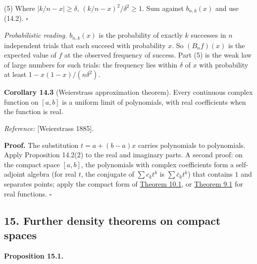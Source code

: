 \documentclass[
  english,
  11pt,
  a4paper,
]{article}
\begin{document}
(5) Where \(|k/n-x|\geq\delta\), \((k/n-x)^2/\delta^2\geq1\). Sum
against \(b_{n,k}(x)\) and use (14.2). \(\square\)

\emph{Probabilistic reading.} \(b_{n,k}(x)\) is the probability of
exactly \(k\) successes in \(n\) independent trials that each succeed
with probability \(x\). So \((B_nf)(x)\) is the expected value of \(f\)
at the observed frequency of success. Part (5) is the weak law of large
numbers for such trials: the frequency lies within \(\delta\) of \(x\)
with probability at least \(1-x(1-x)/(n\delta^2)\).

\textbf{Corollary 14.3} (Weierstrass approximation theorem). Every
continuous complex function on \([a,b]\) is a uniform limit of
polynomials, with real coefficients when the function is real.

\emph{Reference:} {[}Weierstrass 1885{]}.

\textbf{Proof.} The substitution \(t=a+(b-a)x\) carries polynomials to
polynomials. Apply Proposition 14.2(2) to the real and imaginary parts.
A second proof: on the compact space \([a,b]\), the polynomials with
complex coefficients form a self-adjoint algebra (for real \(t\), the
conjugate of \(\sum c_kt^k\) is \(\sum\bar c_kt^k\)) that contains \(1\)
and separates points; apply the compact form of
\hyperlink{the-stone-weierstrass-theorem-for-functions-vanishing-at-infinity--oa-fnd-sw-09}{Theorem
10.1}, or
\hyperlink{the-stone-weierstrass-theorem-for-functions-vanishing-at-infinity--oa-fnd-sw-07}{Theorem
9.1} for real functions. \(\square\)

\subsection[15. Further density theorems on compact
spaces]{\texorpdfstring{\protect\hypertarget{the-stone-weierstrass-theorem-for-functions-vanishing-at-infinity--oa-fnd-sw-17}{}{}15.
Further density theorems on compact
spaces}{15. Further density theorems on compact spaces}}\label{the-stone-weierstrass-theorem-for-functions-vanishing-at-infinity--OA-FND-SW-17}

\textbf{Proposition 15.1.}
\end{document}
